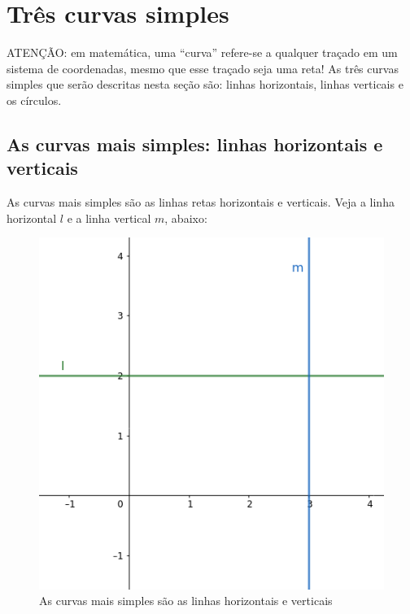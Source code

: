 \documentclass[pdftex, brazil, 12pt, twoside]{article}
\begin{document}
\section{Três curvas simples}
\label{tres-curvas}

ATENÇÃO: em matemática, uma ``curva'' refere-se a qualquer traçado em um sistema
de coordenadas, mesmo que esse traçado seja uma reta! As três curvas simples que
serão descritas nesta seção são: linhas horizontais, linhas verticais e os círculos.

\subsection{As curvas mais simples: linhas horizontais e verticais}
\label{tres-curvas-linhas-simples}

As curvas mais simples são as linhas retas horizontais e verticais. Veja a linha
horizontal $l$ e a linha vertical $m$, abaixo:

\begin{figure}[ht]
  \begin{center}
    \caption{As curvas mais simples são as linhas horizontais e verticais}
    \label{fig:curvas-simples}
    \includegraphics[scale=0.5]{imagens/curvas-simples.png}
    
  \end{center}
\end{figure}
\end{document}

